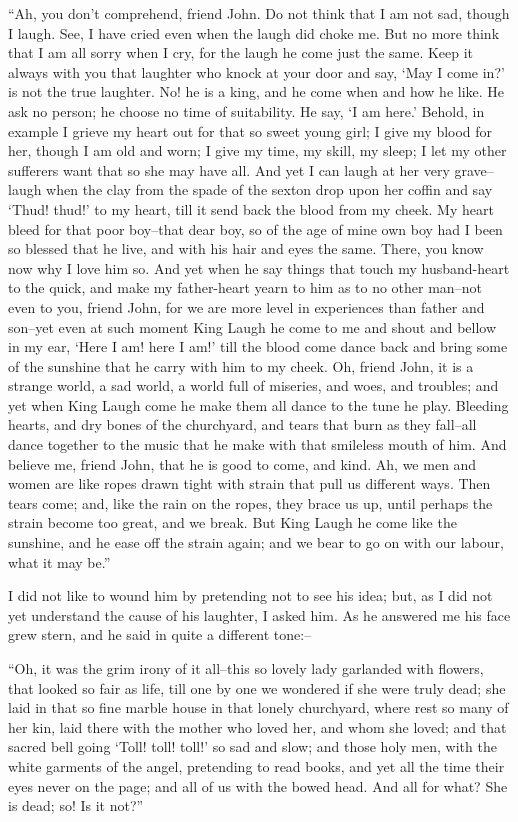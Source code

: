 \documentclass[12pt,openright]{book}
\begin{document}
“Ah, you don’t comprehend, friend John. Do not think that I am not sad, though I laugh. See, I have cried even when the laugh did choke me. But no more think that I am all sorry when I cry, for the laugh he come just the same. Keep it always with you that laughter who knock at your door and say, ‘May I come in?’ is not the true laughter. No! he is a king, and he come when and how he like. He ask no person; he choose no time of suitability. He say, ‘I am here.’ Behold, in example I grieve my heart out for that so sweet young girl; I give my blood for her, though I am old and worn; I give my time, my skill, my sleep; I let my other sufferers want that so she may have all. And yet I can laugh at her very grave–laugh when the clay from the spade of the sexton drop upon her coffin and say ‘Thud! thud!’ to my heart, till it send back the blood from my cheek. My heart bleed for that poor boy–that dear boy, so of the age of mine own boy had I been so blessed that he live, and with his hair and eyes the same. There, you know now why I love him so. And yet when he say things that touch my husband-heart to the quick, and make my father-heart yearn to him as to no other man–not even to you, friend John, for we are more level in experiences than father and son–yet even at such moment King Laugh he come to me and shout and bellow in my ear, ‘Here I am! here I am!’ till the blood come dance back and bring some of the sunshine that he carry with him to my cheek. Oh, friend John, it is a strange world, a sad world, a world full of miseries, and woes, and troubles; and yet when King Laugh come he make them all dance to the tune he play. Bleeding hearts, and dry bones of the churchyard, and tears that burn as they fall–all dance together to the music that he make with that smileless mouth of him. And believe me, friend John, that he is good to come, and kind. Ah, we men and women are like ropes drawn tight with strain that pull us different ways. Then tears come; and, like the rain on the ropes, they brace us up, until perhaps the strain become too great, and we break. But King Laugh he come like the sunshine, and he ease off the strain again; and we bear to go on with our labour, what it may be.”

I did not like to wound him by pretending not to see his idea; but, as I did not yet understand the cause of his laughter, I asked him. As he answered me his face grew stern, and he said in quite a different tone:–

“Oh, it was the grim irony of it all–this so lovely lady garlanded with flowers, that looked so fair as life, till one by one we wondered if she were truly dead; she laid in that so fine marble house in that lonely churchyard, where rest so many of her kin, laid there with the mother who loved her, and whom she loved; and that sacred bell going ‘Toll! toll! toll!’ so sad and slow; and those holy men, with the white garments of the angel, pretending to read books, and yet all the time their eyes never on the page; and all of us with the bowed head. And all for what? She is dead; so! Is it not?”
\end{document}

